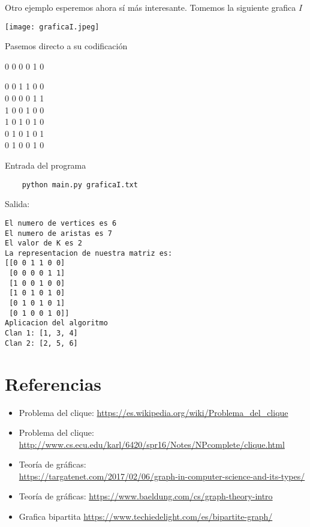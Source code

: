 \documentclass[12pt,letterpaper]{article}
\begin{document}
Otro ejemplo esperemos ahora sí más interesante. Tomemos la siguiente grafica $I$

\begin{center}
    \texttt{[image: graficaI.jpeg]}
\end{center}
\newpage
Pasemos directo a su codificación

\begin{center}
0 0 0 0 1 0 


0 0 1 1 0 0  \\
0 0 0 0 1 1  \\
1 0 0 1 0 0 \\
1 0 1 0 1 0 \\
0 1 0 1 0 1 \\
0 1 0 0 1 0 \\
\end{center}

Entrada del programa

\begin{verbatim}
    python main.py graficaI.txt
\end{verbatim}

Salida:
\begin{verbatim}
El numero de vertices es 6
El numero de aristas es 7
El valor de K es 2
La representacion de nuestra matriz es:
[[0 0 1 1 0 0]
 [0 0 0 0 1 1]
 [1 0 0 1 0 0]
 [1 0 1 0 1 0]
 [0 1 0 1 0 1]
 [0 1 0 0 1 0]]
Aplicacion del algoritmo
Clan 1: [1, 3, 4]
Clan 2: [2, 5, 6]
\end{verbatim}






\section*{Referencias}
\begin{itemize}
    \item Problema del clique: \url{https://es.wikipedia.org/wiki/Problema_del_clique}
    
    \item Problema del clique: \url{http://www.cs.ecu.edu/karl/6420/spr16/Notes/NPcomplete/clique.html}
    
    \item Teoría de gráficas:\\
    \url{https://targatenet.com/2017/02/06/graph-in-computer-science-and-its-types/}
    
    \item Teoría de gráficas: \url{https://www.baeldung.com/cs/graph-theory-intro}
    
    \item Grafica bipartita \url{https://www.techiedelight.com/es/bipartite-graph/}
    
\end{itemize}
\end{document}
